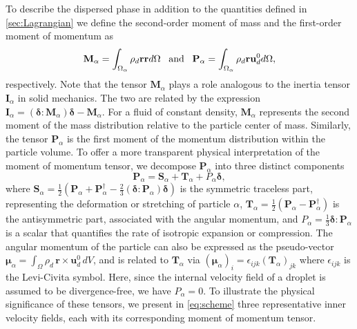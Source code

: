 To describe the dispersed phase in addition to the quantities defined in \ref{sec:Lagrangian} we define the second-order moment of mass and the first-order moment of momentum as 
\begin{equation}
    \textbf{M}_\alpha 
    = \intO{ \rho_d \textbf{r} \textbf{r} }
    \;\;\;\text{and}\;\;\;
    \textbf{P}_\alpha 
    = \intO{ \rho_d \textbf{r} \textbf{u}_d^0 },
    \label{eq:first_moment_of_momentum_def}
\end{equation}
respectively. 
Note that the tensor $\textbf{M}_\alpha$ plays a role analogous to the inertia tensor $\textbf{I}_\alpha$ in solid mechanics. 
The two are related by the expression  $\textbf{I}_\alpha = (\bm\delta : \textbf{M}_\alpha)\bm\delta - \textbf{M}_\alpha$.
For a fluid of constant density, $\textbf{M}_\alpha$ represents the second moment of the mass distribution relative to the particle center of mass.
Similarly, the tensor $\textbf{P}_\alpha$ is the first moment of the momentum distribution within the particle volume. 
To offer a more transparent physical interpretation of the moment of momentum tensor, we decompose $\textbf{P}_\alpha$ into three distinct components  
\begin{equation}
\textbf{P}_\alpha = \textbf{S}_\alpha + \textbf{T}_\alpha + P_\alpha \bm\delta,
\end{equation}
where $\textbf{S}_\alpha = \frac{1}{2}\left(\textbf{P}_\alpha + \textbf{P}_\alpha^\dagger - \frac{2}{3}(\bm\delta:\textbf{P}_\alpha)\bm\delta\right)$ is the symmetric traceless part, representing the  deformation or stretching of particle $\alpha$,
$\textbf{T}_\alpha = \frac{1}{2}(\textbf{P}_\alpha - \textbf{P}_\alpha^\dagger)$ is the antisymmetric part, associated with the angular momentum,
and $P_\alpha = \frac{1}{3} \bm\delta : \textbf{P}_\alpha$ is a scalar that quantifies the rate of isotropic expansion or compression. 
The angular momentum of the particle can also be expressed as the pseudo-vector  
$\bm\mu_\alpha = \int_\Omega \rho_d\, \textbf{r} \times \textbf{u}_d^0 \, dV$,
and is related to $\textbf{T}_\alpha$ via $(\bm\mu_\alpha)_i = \epsilon_{ijk} (\textbf{T}_\alpha)_{jk}$ %
where $\epsilon_{ijk}$ is the Levi-Civita symbol.
Here, since the internal velocity field of a droplet is assumed to be divergence-free, we have $P_\alpha = 0$.
To illustrate the physical significance of these tensors, we present in \ref{eq:scheme} three representative inner velocity fields, each with its corresponding moment of momentum tensor.
